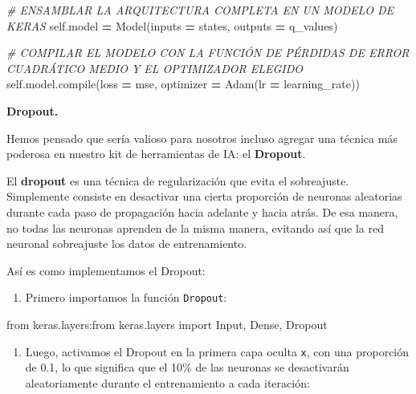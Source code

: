 \documentclass[
]{book}
\newenvironment{Shaded}{\begin{snugshade}}{\end{snugshade}}
\newcommand{\BuiltInTok}[1]{#1}
\newcommand{\CommentTok}[1]{\textcolor[rgb]{0.56,0.35,0.01}{\textit{#1}}}
\newcommand{\ImportTok}[1]{#1}
\newcommand{\NormalTok}[1]{#1}
\newcommand{\OperatorTok}[1]{\textcolor[rgb]{0.81,0.36,0.00}{\textbf{#1}}}
\newcommand{\StringTok}[1]{\textcolor[rgb]{0.31,0.60,0.02}{#1}}
\newcommand{\VariableTok}[1]{\textcolor[rgb]{0.00,0.00,0.00}{#1}}
\providecommand{\tightlist}{%
  \setlength{\itemsep}{0pt}\setlength{\parskip}{0pt}}
\begin{document}
\begin{Shaded}
\begin{Highlighting}[]
        \CommentTok{\# ENSAMBLAR LA ARQUITECTURA COMPLETA EN UN MODELO DE KERAS}
        \VariableTok{self}\NormalTok{.model }\OperatorTok{=}\NormalTok{ Model(inputs }\OperatorTok{=}\NormalTok{ states, outputs }\OperatorTok{=}\NormalTok{ q\_values)}
        
        \CommentTok{\# COMPILAR EL MODELO CON LA FUNCIÓN DE PÉRDIDAS DE ERROR CUADRÁTICO MEDIO Y EL OPTIMIZADOR ELEGIDO}
        \VariableTok{self}\NormalTok{.model.}\BuiltInTok{compile}\NormalTok{(loss }\OperatorTok{=} \StringTok{\textquotesingle{}mse\textquotesingle{}}\NormalTok{, optimizer }\OperatorTok{=}\NormalTok{ Adam(lr }\OperatorTok{=}\NormalTok{ learning\_rate))}
\end{Highlighting}
\end{Shaded}

\textbf{Dropout.}

Hemos pensado que sería valioso para nosotros incluso agregar una técnica más poderosa en nuestro kit de herramientas de IA: el \textbf{Dropout}.

El \textbf{dropout} es una técnica de regularización que evita el sobreajuste. Simplemente consiste en desactivar una cierta proporción de neuronas aleatorias durante cada paso de propagación hacia adelante y hacia atrás. De esa manera, no todas las neuronas aprenden de la misma manera, evitando así que la red neuronal sobreajuste los datos de entrenamiento.

Así es como implementamos el Dropout:

\begin{enumerate}
\def\labelenumi{\arabic{enumi}.}
\tightlist
\item
  Primero importamos la función \texttt{Dropout}:
\end{enumerate}

\begin{Shaded}
\begin{Highlighting}[]
    \ImportTok{from}\NormalTok{ keras.layers:}\ImportTok{from}\NormalTok{ keras.layers }\ImportTok{import}\NormalTok{ Input, Dense, Dropout}
\end{Highlighting}
\end{Shaded}

\begin{enumerate}
\def\labelenumi{\arabic{enumi}.}
\setcounter{enumi}{1}
\tightlist
\item
  Luego, activamos el Dropout en la primera capa oculta \texttt{x}, con una proporción de 0.1, lo que significa que el 10\% de las neuronas se desactivarán aleatoriamente durante el entrenamiento a cada iteración:
\end{enumerate}
\end{document}
